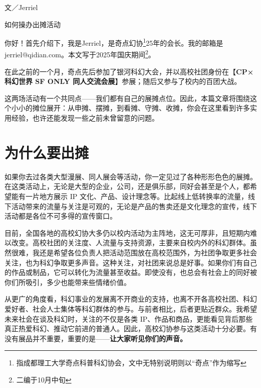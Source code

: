 \pagestyle{fancy}
\fancyhf{}
\fancyfoot[RO]{\thepage}
\fancyfoot[LE]{\thepage}
\renewcommand{\headrulewidth}{0pt}
\renewcommand{\footrulewidth}{0pt}
\setlength{\headheight}{15pt}


{\raggedright
  \fangsong 文／Jerriel
}

\vspace{2mm}

{\raggedright
  \heiti 如何操办出摊活动
}

\vspace{2mm}
你好！首先介绍下，我是Jerriel，是奇点幻协\footnote{指成都理工大学奇点科普科幻协会，文中无特别说明则以``奇点''作为缩写}25年的会长。我的邮箱是jerriel@qidian.com。本文写于2025年国庆期间\footnote{二编于10月中旬}。

在此之前的一个月，奇点先后参加了银河科幻大会，并以高校社团身份在【\textbf{CP×科幻世界
SF ONLY 同人交流会展}】参展；随后又参与了校内的百团大战。

这两场活动有一个共同点------我们都有自己的展摊点位。因此，本篇文章将围绕这个小小的摊位展开：从申摊、摆摊，到看摊、守摊、收摊，你会在这里看到许多实用经验，也许还能发现一些之前未曾留意的问题。

\section{为什么要出摊}\label{ux4e3aux4ec0ux4e48ux8981ux51faux644a}

如果你去过各类大型漫展、同人展会等活动，你一定见过了各种形形色色的展摊。在这类活动上，无论是大型的企业，公司，还是俱乐部，同好会甚至是个人，都希望能有一片地方展示
IP
文化、产品、设计理念等。比起线上低转换率的流量，线下活动带来的流量与关注是可观的，无论是产品的售卖还是文化理念的宣传，线下活动都是各位不可多得的宣传窗口。

目前，全国各地的高校幻协大多仍以校内活动为主阵地，这无可厚非，且短期内难以改变。高校社团的关注度、人流量与支持资源，主要来自校内外的科幻群体。虽然很难，我还是希望各位负责人把活动范围放在高校范围外，为社团争取更多社会关注，也为科幻争取更多声音。这种关注，对社团来说总是好事。如果你们有自己的作品或制品，它可以转化为流量甚至收益。即使没有，也总会有社会上的同好被你们所吸引，多少也能带来些情绪价值。

从更广的角度看，科幻事业的发展离不开商业的支持，也离不开各高校社团、科幻爱好者、社会人士集体等科幻群体的参与。与前者相比，后者更贴近群众。我希望未来社会在谈及科幻时，关注的不仅是各类
IP、作品和商品，更能看见背后那些真正热爱科幻、推动它前进的普通人。因此，高校幻协参与这类活动十分必要。有没有展品并不重要，重要的是------\textbf{让大家听见你们的声音。}

